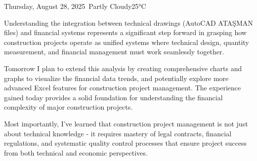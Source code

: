 \begin{dailyentry}{Thursday, August 28, 2025}{\weathercloudy\ Partly Cloudy}{25°C}
\begin{dailynotes}
Understanding the integration between technical drawings (AutoCAD ATAŞMAN files) and financial systems represents a significant step forward in grasping how construction projects operate as unified systems where technical design, quantity measurement, and financial management must work seamlessly together.

Tomorrow I plan to extend this analysis by creating comprehensive charts and graphs to visualize the financial data trends, and potentially explore more advanced Excel features for construction project management. The experience gained today provides a solid foundation for understanding the financial complexity of major construction projects.

Most importantly, I've learned that construction project management is not just about technical knowledge - it requires mastery of legal contracts, financial regulations, and systematic quality control processes that ensure project success from both technical and economic perspectives.
\end{dailynotes}

\begin{approvalsection}
\end{approvalsection}

\end{dailyentry}
